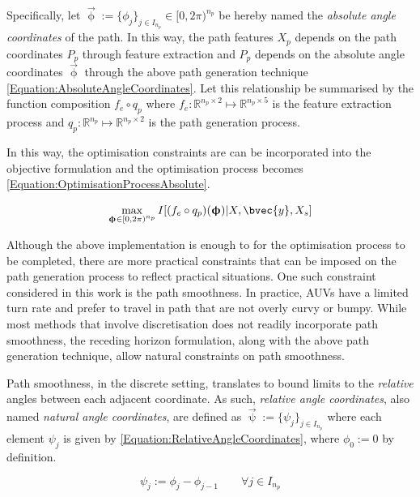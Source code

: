 			Specifically, let $\vec{\upphi} := \{\phi_{j}\}_{j \in I_{n_{p}}} \in [0, 2 \pi)^{n_{p}}$ be hereby named the \textit{absolute angle coordinates} of the path. In this way, the path features $X_{p}$ depends on the path coordinates $P_{p}$ through feature extraction and $P_{p}$ depends on the absolute angle coordinates $\vec{\upphi}$ through the above path generation technique \eqref{Equation:AbsoluteAngleCoordinates}. Let this relationship be summarised by the function composition $f_{e} \circ q_{p}$ where $f_{e}: \mathbb{R}^{n_{p} \times 2} \mapsto \mathbb{R}^{n_{p} \times 5}$ is the feature extraction process and $q_{p}: \mathbb{R}^{n_{p}} \mapsto \mathbb{R}^{n_{p} \times 2}$ is the path generation process.
			
			In this way, the optimisation constraints are can be incorporated into the objective formulation and the optimisation process becomes \eqref{Equation:OptimisationProcessAbsolute}.
			
			\begin{equation}
				\max_{\vec{\upphi} \in [0, 2 \pi)^{n_{p}}} I[(f_{e} \circ q_{p})(\vec{\upphi}) | X, \bvec{y}, X_{s}]				
			\label{Equation:OptimisationProcessAbsolute}
			\end{equation}	
			
			Although the above implementation is enough to for the optimisation process to be completed, there are more practical constraints that can be imposed on the path generation process to reflect practical situations. One such constraint considered in this work is the path smoothness. In practice, AUVs have a limited turn rate and prefer to travel in path that are not overly curvy or bumpy. While most methods that involve discretisation does not readily incorporate path smoothness, the receding horizon formulation, along with the above path generation technique, allow natural constraints on path smoothness.
			
			Path smoothness, in the discrete setting, translates to bound limits to the \textit{relative} angles between each adjacent coordinate. As such, \textit{relative angle coordinates}, also named \textit{natural angle coordinates}, are defined as $\vec{\uppsi} := \{\psi_{j}\}_{j \in I_{n_{p}}}$ where each element $\psi_{j}$ is given by \eqref{Equation:RelativeAngleCoordinates}, where $\phi_{0} := 0$ by definition. 
			
			\begin{equation}
				\psi_{j} := \phi_{j} - \phi_{j - 1}	\qquad \forall j \in I_{n_{p}}
			\label{Equation:RelativeAngleCoordinates}
			\end{equation}
			
